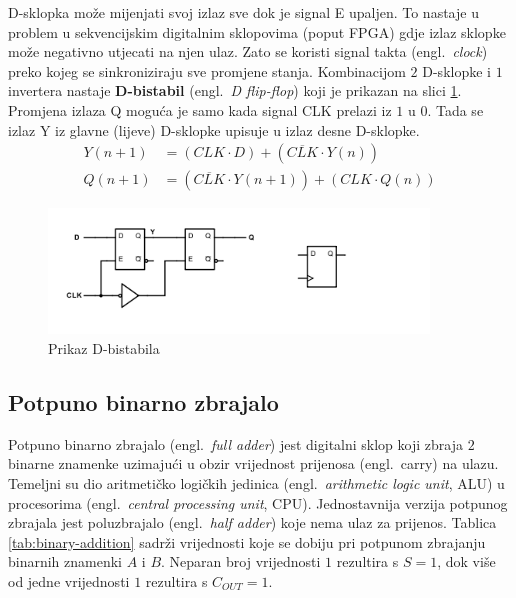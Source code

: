 \documentclass[times, utf8, diplomski]{fer}
\begin{document}
D-sklopka može mijenjati svoj izlaz sve dok je signal E upaljen. To nastaje u problem u sekvencijskim digitalnim sklopovima (poput FPGA) gdje izlaz sklopke može negativno utjecati na njen ulaz. Zato se koristi signal takta (engl.~\textit{clock}) preko kojeg se sinkroniziraju sve promjene stanja. Kombinacijom $2$ D-sklopke i $1$ invertera nastaje \textbf{D-bistabil} (engl.~\textit{D flip-flop}) koji je prikazan na slici \ref{fig:D-flip-flop}. Promjena izlaza Q moguća je samo kada signal CLK prelazi iz $1$ u $0$. Tada se izlaz Y iz glavne (lijeve) D-sklopke upisuje u izlaz desne D-sklopke.
%
\begin{align}
	Y(n+1) &= (CLK \cdot D) + (\overline{CLK} \cdot Y(n)) \\
	Q(n+1) &= (\overline{CLK} \cdot Y(n+1)) + (CLK \cdot Q(n))
\end{align}

\begin{figure}[htb]
	\centering
	\includegraphics[width=0.9\textwidth]{img/D_flip-flop_full.png}
	\caption{Prikaz D-bistabila}
	\label{fig:D-flip-flop}
\end{figure}

\subsection{Potpuno binarno zbrajalo} \label{subsec:adders}

Potpuno binarno zbrajalo (engl.~\textit{full adder}) jest digitalni sklop koji zbraja $2$ binarne znamenke uzimajući u obzir vrijednost prijenosa (engl.~carry) na ulazu. Temeljni su dio aritmetičko logičkih jedinica (engl.~\textit{arithmetic logic unit}, ALU) u procesorima (engl.~\textit{central processing unit}, CPU). Jednostavnija verzija potpunog zbrajala jest poluzbrajalo (engl.~\textit{half adder}) koje nema ulaz za prijenos. Tablica \ref{tab:binary-addition} sadrži vrijednosti koje se dobiju pri potpunom zbrajanju binarnih znamenki $A$ i $B$. Neparan broj vrijednosti $1$ rezultira s $S=1$, dok više od jedne vrijednosti $1$ rezultira s $C_{OUT}=1$.
\end{document}
